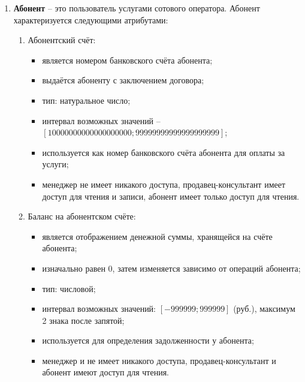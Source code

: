 \begin{enumerate}
    \item \textbf{Абонент} -- это пользователь услугами сотового оператора. Абонент характеризуется следующими атрибутами:
    \begin{enumerate}
        \item Абонентский счёт:
        \begin{itemize}
            \item является номером банковского счёта абонента;
            \item выдаётся абоненту с заключением договора;
            \item тип: натуральное число;
            \item интервал возможных значений -- $[10 000 000 000 000 000 000; 99 999 999 999 999 999 999]$;
            \item используется как номер банковского счёта абонента для оплаты за услуги;
            \item менеджер не имеет никакого доступа, продавец-консультант имеет доступ для чтения и записи, абонент имеет только доступ для чтения.
        \end{itemize}

        \item Баланс на абонентском счёте:
        \begin{itemize}
            \item является отображением денежной суммы, хранящейся на счёте абонента;
            \item изначально равен 0, затем изменяется зависимо от операций абонента;
            \item тип: числовой;
            \item интервал возможных значений: $[-999 999; 999 999]$ (руб.), максимум 2 знака после запятой; %
            \item используется для определения задолженности у абонента;
            \item менеджер и не имеет никакого доступа, продавец-консультант и абонент имеют доступ для чтения.
        \end{itemize}


\end{enumerate}
\end{enumerate}
